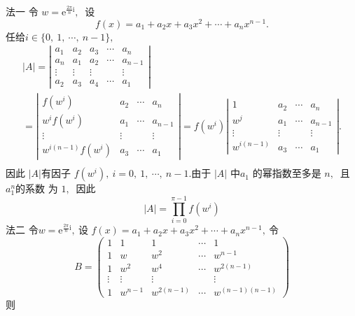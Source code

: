 \begin{solution}
	法一 令  $w=\mathrm{e}^{\frac{2 \pi}{n}\text{i}} ,\ $ 设
	$$f(x)=a_{1}+a_{2} x+a_{3} x^{2}+\cdots+a_{n} x^{n-1} .$$
	任给$  i \in\{0,\ 1,\  \cdots,\  n-1\} ,\ $
	$$\begin{array}{l}
		|A|=\left|\begin{array}{ccccc}
			a_{1} & a_{2} & a_{3} & \cdots & a_{n} \\
			a_{n} & a_{1} & a_{2} & \cdots & a_{n-1} \\
			\vdots & \vdots & \vdots & & \vdots \\
			a_{2} & a_{3} & a_{4} & \cdots & a_{1}
		\end{array}\right| \\
		=\left|\begin{array}{cccc}
			f\left(w^{i}\right) & a_{2} & \cdots & a_{n} \\
			w^{i} f\left(w^{i}\right) & a_{1} & \cdots & a_{n-1} \\
			\vdots & \vdots & & \vdots \\
			w^{i(n-1)} f\left(w^{i}\right) & a_{3} & \cdots & a_{1}
		\end{array}\right|=f\left(w^{i}\right)\left|\begin{array}{cccc}
			1 & a_{2} & \cdots & a_{n} \\
			w^{j} & a_{1} & \cdots & a_{n-1} \\
			\vdots & \vdots & & \vdots \\
			w^{i(n-1)} & a_{3} & \cdots & a_{1}
		\end{array}\right| . \\
	\end{array}$$
	因此 $ |A|  $有因子 $ f\left(w^{i}\right),\  i=0,\ 1,\  \cdots,\  n-1 .$由于  $|A|$  中$  a_{1}$  的幂指数至多是  $n ,\ $ 且  $a_{1}^{n}  $的系数 为 $1 ,\ $ 因此
	$$|A|=\prod_{i=0}^{\pi-1} f\left(w^{i}\right)$$
	法二 令$  w=\mathrm{e}^{\frac{2\pi}{n}\mathrm{i}} ,\  $设  $f(x)=a_{1}+a_{2} x+a_{3} x^{2}+\cdots+a_{n} x^{n-1} ,\ $令
	$$B=\left(\begin{array}{ccccc}
		1 & 1 & 1 & \cdots & 1 \\
		1 & w & w^{2} & \cdots & w^{n-1} \\
		1 & w^{2} & w^{4} & \cdots & w^{2(n-1)} \\
		\vdots & \vdots & \vdots & & \vdots \\
		1 & w^{n-1} & w^{2(n-1)} & \cdots & w^{(n-1)(n-1)}
	\end{array}\right)$$
	则
	$$
	\begin{aligned}

\end{aligned}$$
\end{solution}
